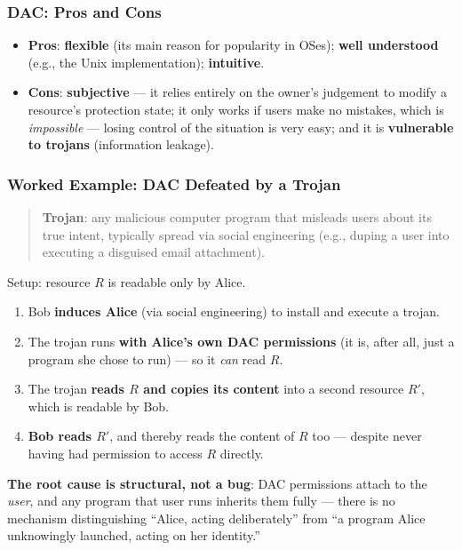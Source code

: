 \documentclass[12pt, a4paper]{article}
\begin{document}
\subsubsection{DAC: Pros and Cons}
\begin{itemize}
    \item \textbf{Pros}: \textbf{flexible} (its main reason for popularity in OSes); \textbf{well understood} (e.g., the Unix implementation); \textbf{intuitive}.
    \item \textbf{Cons}: \textbf{subjective} --- it relies entirely on the owner's judgement to modify a resource's protection state; it only works if users make no mistakes, which is \emph{impossible} --- losing control of the situation is very easy; and it is \textbf{vulnerable to trojans} (information leakage).
\end{itemize}

\subsubsection{Worked Example: DAC Defeated by a Trojan}
\begin{quote}
\textcolor{blue!50!black}{\textbf{Trojan}}: any malicious computer program that misleads users about its true intent, typically spread via social engineering (e.g., duping a user into executing a disguised email attachment).
\end{quote}
Setup: resource $R$ is readable only by Alice.
\begin{enumerate}
    \item Bob \textbf{induces Alice} (via social engineering) to install and execute a trojan.
    \item The trojan runs \textbf{with Alice's own DAC permissions} (it is, after all, just a program she chose to run) --- so it \emph{can} read $R$.
    \item The trojan \textbf{reads $R$ and copies its content} into a second resource $R'$, which is readable by Bob.
    \item \textbf{Bob reads $R'$}, and thereby reads the content of $R$ too --- despite never having had permission to access $R$ directly.
\end{enumerate}
\textcolor{red!70!black}{\textbf{The root cause is structural, not a bug}}: DAC permissions attach to the \emph{user}, and any program that user runs inherits them fully --- there is no mechanism distinguishing ``Alice, acting deliberately'' from ``a program Alice unknowingly launched, acting on her identity.''
\end{document}
